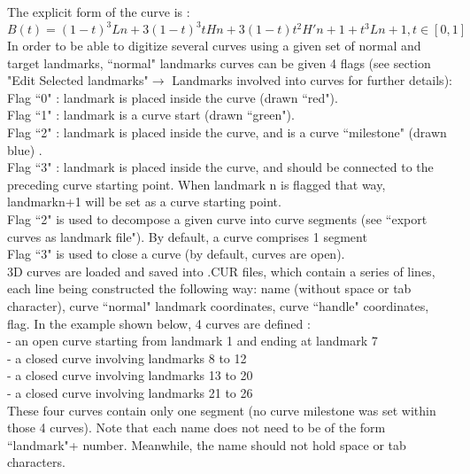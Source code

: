 The explicit form of the curve is :
\begin{equation}
B(t) = (1-t)^{3}Ln + 3(1-t)^{3}tHn + 3(1-t)t^{2}H'n+1 +t^{3}Ln+1, t \in[0,1]
\end{equation}
In order to be able to digitize several curves using a given set of normal and target landmarks,
``normal" landmarks curves can be given 4 flags (see section "Edit Selected landmarks"$\rightarrow$ Landmarks
involved into curves for further details):\\
Flag ``0" : landmark is placed inside the curve (drawn ``red").\\
Flag ``1" : landmark is a curve start (drawn ``green").\\
Flag ``2" : landmark is placed inside the curve, and is a curve ``milestone" (drawn blue) .\\
Flag ``3" : landmark is placed inside the curve, and should be connected to the preceding curve
starting point. When landmark n is flagged that way, landmarkn+1 will be set as a curve starting point.\\
Flag ``2" is used to decompose a given curve into curve segments (see ``export curves as landmark file"). By default, a curve comprises 1 segment\\
Flag ``3" is used to close a curve (by default, curves are open).\\
3D curves are loaded and saved into .CUR files, which contain a series of lines, each line being
constructed the following way: name (without space or tab character), curve ``normal" landmark
coordinates, curve ``handle" coordinates, flag.
In the example shown below, 4 curves are defined :\\
- an open curve starting from landmark 1 and ending at landmark 7\\
- a closed curve involving landmarks 8 to 12\\
- a closed curve involving landmarks 13 to 20\\
- a closed curve involving landmarks 21 to 26\\
These four curves contain only one segment (no curve milestone was set within those 4 curves).
Note that each name does not need to be of the form ``landmark"+ number. Meanwhile, the name
should not hold space or tab characters.
